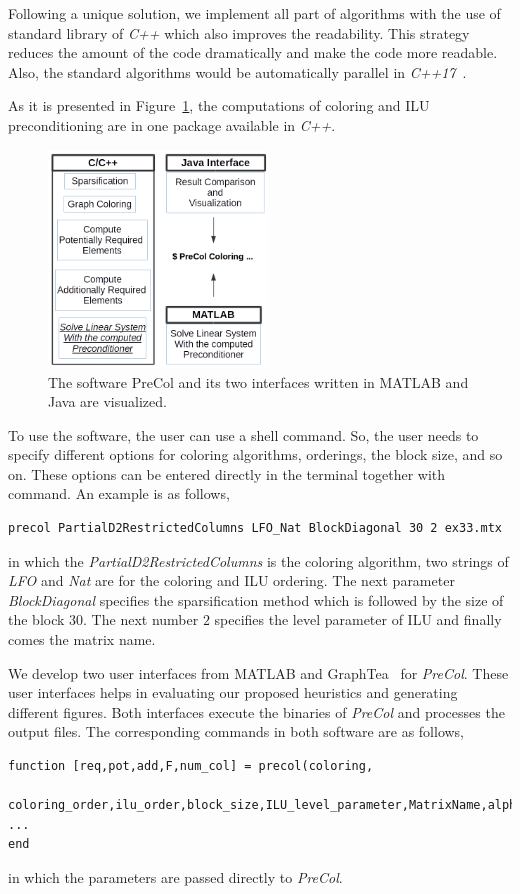 \documentclass[12pt, twoside,a4paper,toc=bibliography]{scrbook}
\newcommand{\figref}[1]{Figure~\protect\ref{#1}}
\begin{document}
Following a unique solution, we implement all part of algorithms
with the use of standard library of \textit{C++} which also improves the readability.
This strategy reduces the amount of the code dramatically and
make the code more readable.
Also, the standard algorithms would be automatically parallel in \textit{C++17}~\cite{parallelcpp}.

As it is presented in \figref{f.structure}, the computations of coloring and ILU preconditioning
are in one package available in \textit{C++}. 
\begin{figure}
\centering
\includegraphics[width=0.52\textwidth]{new_struct}
\caption{
The software PreCol and its two interfaces written in MATLAB and Java are visualized.}
\label{f.structure}
\end{figure}

To use the software, the user can use a shell command.
So, the user needs to specify different
options for coloring algorithms, orderings, the block size, and so on.
These options can be entered directly in the terminal together with command.
An example is as follows,
\begin{lstlisting}
precol PartialD2RestrictedColumns LFO_Nat BlockDiagonal 30 2 ex33.mtx
\end{lstlisting}
in which the \textit{PartialD2RestrictedColumns} is the coloring algorithm,
two strings of \textit{LFO} and \textit{Nat} are for the coloring and ILU ordering.
The next parameter \textit{BlockDiagonal} specifies the sparsification method
which is followed by the size of the block $30$. The next number $2$ specifies
the level parameter of ILU and finally comes the matrix name.

We develop two user interfaces from MATLAB and GraphTea~\cite{2014:07,2014:15,2014:16} for \textit{PreCol}.
These user interfaces helps in evaluating our proposed heuristics and
generating different figures. Both interfaces execute the binaries of \textit{PreCol} and
processes the output files.
The corresponding commands in both software are as follows,
\begin{lstlisting}
function [req,pot,add,F,num_col] = precol(coloring,
	coloring_order,ilu_order,block_size,ILU_level_parameter,MatrixName,alpha)
...
end
\end{lstlisting}
in which the parameters are passed directly to \textit{PreCol}.
\end{document}
